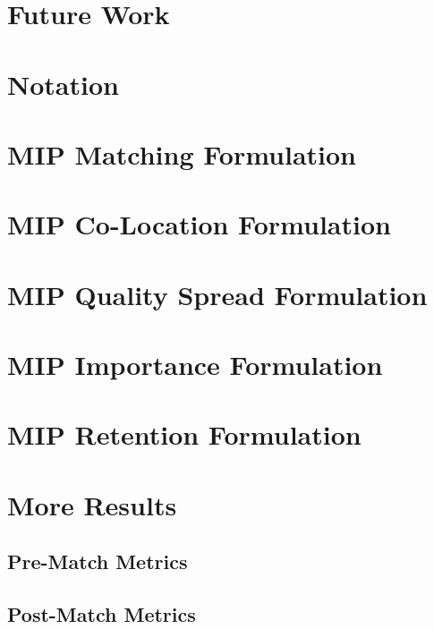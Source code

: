 \documentclass{article}
\begin{document}


\section{Future Work}



\nocite{*}



\newpage

\appendix
\appendixpage
\addappheadtotoc

\section{Notation}



\newpage

\section{MIP Matching Formulation}
\label{Matching}



\newpage 

\section{MIP Co-Location Formulation}
\label{CoLocation}



\newpage

\section{MIP Quality Spread Formulation}
\label{QualitySpread}



\newpage

\section{MIP Importance Formulation}
\label{Importance}



\newpage

\section{MIP Retention Formulation}
\label{Retention}



\newpage

\section{More Results}

\subsection{Pre-Match Metrics}


\subsection{Post-Match Metrics}
\end{document}
